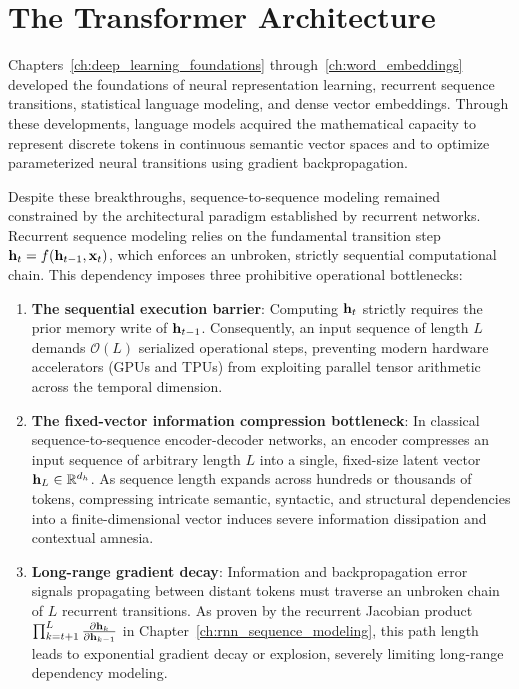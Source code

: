 \documentclass[../../main.tex]{subfiles}
\begin{document}
\chapter{The Transformer Architecture}
\label{ch:transformer_architecture}

Chapters~\ref{ch:deep_learning_foundations} through~\ref{ch:word_embeddings} developed the foundations of neural representation learning, recurrent sequence transitions, statistical language modeling, and dense vector embeddings. Through these developments, language models acquired the mathematical capacity to represent discrete tokens in continuous semantic vector spaces and to optimize parameterized neural transitions using gradient backpropagation.

Despite these breakthroughs, sequence-to-sequence modeling remained constrained by the architectural paradigm established by recurrent networks. Recurrent sequence modeling relies on the fundamental transition step $\mathbf{h}_t = f(\mathbf{h}_{t-1}, \mathbf{x}_t)$, which enforces an unbroken, strictly sequential computational chain. This dependency imposes three prohibitive operational bottlenecks:
\begin{enumerate}
    \item \textbf{The sequential execution barrier}: Computing $\mathbf{h}_t$ strictly requires the prior memory write of $\mathbf{h}_{t-1}$. Consequently, an input sequence of length $L$ demands $\mathcal{O}(L)$ serialized operational steps, preventing modern hardware accelerators (GPUs and TPUs) from exploiting parallel tensor arithmetic across the temporal dimension.
    \item \textbf{The fixed-vector information compression bottleneck}: In classical sequence-to-sequence encoder-decoder networks, an encoder compresses an input sequence of arbitrary length $L$ into a single, fixed-size latent vector $\mathbf{h}_L \in \mathbb{R}^{d_h}$. As sequence length expands across hundreds or thousands of tokens, compressing intricate semantic, syntactic, and structural dependencies into a finite-dimensional vector induces severe information dissipation and contextual amnesia.
    \item \textbf{Long-range gradient decay}: Information and backpropagation error signals propagating between distant tokens must traverse an unbroken chain of $L$ recurrent transitions. As proven by the recurrent Jacobian product $\prod_{k=t+1}^L \frac{\partial \mathbf{h}_k}{\partial \mathbf{h}_{k-1}}$ in Chapter~\ref{ch:rnn_sequence_modeling}, this path length leads to exponential gradient decay or explosion, severely limiting long-range dependency modeling.
\end{enumerate}
\end{document}
